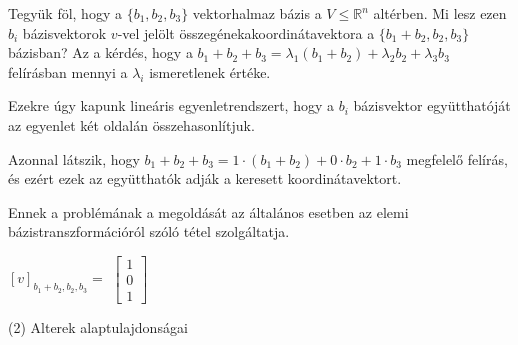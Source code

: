 \begin{frame}
  \begin{tcolorbox}[title={1/4. {\symqueen}}]
      Tegyük föl, hogy a $\{b_1,b_2,b_3\}$ vektorhalmaz bázis a $V \leq \mathbb{R}^n$ altérben. Mi lesz ezen $b_i$ bázisvektorok $v$-vel jelölt összegénekakoordinátavektora a $\{b_1+b_2,b_2,b_3\}$ bázisban?
  \tcblower
     Az a kérdés, hogy a $b_1+b_2+b_3 = {\lambda}_1(b_1+b_2)+{\lambda}_2b_2+{\lambda}_3b_3$ felírásban mennyi a ${\lambda}_i$ ismeretlenek értéke.\\
    \mmedskip
    
      Ezekre úgy kapunk lineáris egyenletrendszert, hogy a $b_i$ bázisvektor együtthatóját az egyenlet két oldalán összehasonlítjuk.\\
      \mmedskip
      
      Azonnal látszik, hogy $b_1 + b_2 + b_3 = 1 \cdot (b_1 + b_2) + 0 \cdot b_2 + 1 \cdot b_3$ megfelelő felírás, és ezért ezek az együtthatók adják a keresett koordinátavektort.\\
      \mmedskip
      
      Ennek a problémának a megoldását az általános esetben az elemi bázistranszformációról szóló tétel szolgáltatja.
      \mmedskip
      
     $[v]_{b_1 + b_2,b_2,b_3} =$ $\begin{bmatrix} 
  				1  \\
  				0 \\
  				1
			\end{bmatrix}$
  \end{tcolorbox}
\end{frame}  

\begin{frame}[plain]
\begin{tcolorbox}[center, colback={myyellow}, coltext={black}, colframe={myyellow}]
    {\RHuge  (2) Alterek alaptulajdonságai}
    \mmedskip
\end{tcolorbox}
\end{frame}

